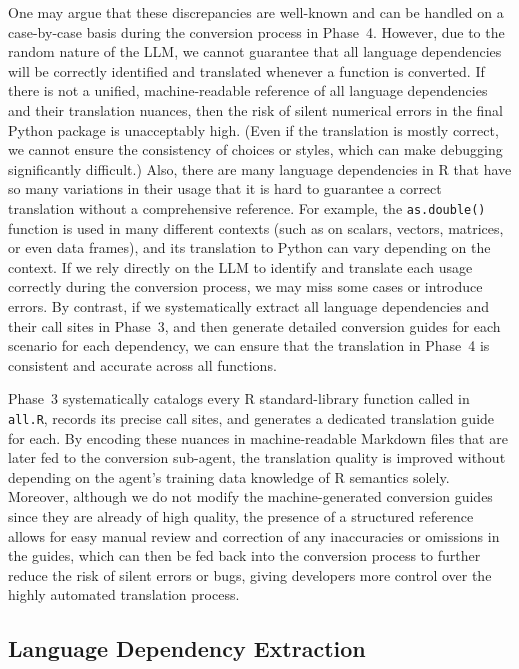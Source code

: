 \documentclass[12pt,a4paper]{article}
\begin{document}
One may argue that these discrepancies are well-known and can be handled on a case-by-case basis during the conversion process in Phase~4. However, due to the random nature of the LLM, we cannot guarantee that all language dependencies will be correctly identified and translated whenever a function is converted. If there is not a unified, machine-readable reference of all language dependencies and their translation nuances, then the risk of silent numerical errors in the final Python package is unacceptably high. (Even if the translation is mostly correct, we cannot ensure the consistency of choices or styles, which can make debugging significantly difficult.) Also, there are many language dependencies in R that have so many variations in their usage that it is hard to guarantee a correct translation without a comprehensive reference. For example, the \texttt{as.double()} function is used in many different contexts (such as on scalars, vectors, matrices, or even data frames), and its translation to Python can vary depending on the context. If we rely directly on the LLM to identify and translate each usage correctly during the conversion process, we may miss some cases or introduce errors. By contrast, if we systematically extract all language dependencies and their call sites in Phase~3, and then generate detailed conversion guides for each scenario for each dependency, we can ensure that the translation in Phase~4 is consistent and accurate across all functions.

Phase~3 systematically catalogs every R standard-library function called in \texttt{all.R}, records its precise call sites, and generates a dedicated translation guide for each. By encoding these nuances in machine-readable Markdown files that are later fed to the conversion sub-agent, the translation quality is improved without depending on the agent's training data knowledge of R semantics solely. Moreover, although we do not modify the machine-generated conversion guides since they are already of high quality, the presence of a structured reference allows for easy manual review and correction of any inaccuracies or omissions in the guides, which can then be fed back into the conversion process to further reduce the risk of silent errors or bugs, giving developers more control over the highly automated translation process.

\subsection{Language Dependency Extraction}
\end{document}
